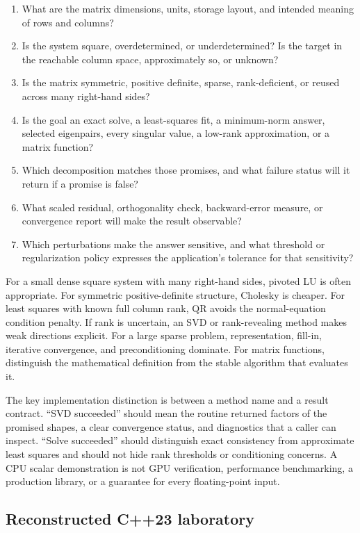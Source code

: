 \begin{enumerate}
\def\labelenumi{\arabic{enumi}.}
\tightlist
\item
  What are the matrix dimensions, units, storage layout, and intended meaning of rows and columns?
\item
  Is the system square, overdetermined, or underdetermined? Is the target in the reachable column space, approximately so, or unknown?
\item
  Is the matrix symmetric, positive definite, sparse, rank-deficient, or reused across many right-hand sides?
\item
  Is the goal an exact solve, a least-squares fit, a minimum-norm answer, selected eigenpairs, every singular value, a low-rank approximation, or a matrix function?
\item
  Which decomposition matches those promises, and what failure status will it return if a promise is false?
\item
  What scaled residual, orthogonality check, backward-error measure, or convergence report will make the result observable?
\item
  Which perturbations make the answer sensitive, and what threshold or regularization policy expresses the application's tolerance for that sensitivity?
\end{enumerate}

For a small dense square system with many right-hand sides, pivoted LU is often appropriate. For symmetric positive-definite structure, Cholesky is cheaper. For least squares with known full column rank, QR avoids the normal-equation condition penalty. If rank is uncertain, an SVD or rank-revealing method makes weak directions explicit. For a large sparse problem, representation, fill-in, iterative convergence, and preconditioning dominate. For matrix functions, distinguish the mathematical definition from the stable algorithm that evaluates it.

The key implementation distinction is between a method name and a result contract. ``SVD succeeded'' should mean the routine returned factors of the promised shapes, a clear convergence status, and diagnostics that a caller can inspect. ``Solve succeeded'' should distinguish exact consistency from approximate least squares and should not hide rank thresholds or conditioning concerns. A CPU scalar demonstration is not GPU verification, performance benchmarking, a production library, or a guarantee for every floating-point input.

\subsection{Reconstructed C++23 laboratory}\label{reconstructed-c23-laboratory}

